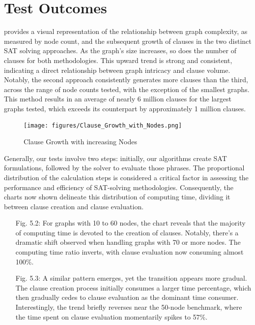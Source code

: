\documentclass[bachelor, english]{algothesis}
\begin{document}
\section{Test Outcomes}
 provides a visual representation of the relationship between graph complexity, as measured by node count, and the subsequent growth of clauses in the two distinct SAT solving approaches. As the graph's size increases, so does the number of clauses for both methodologies. This upward trend is strong and consistent, indicating a direct relationship between graph intricacy and clause volume. Notably, the second approach consistently generates more clauses than the third, across the range of node counts tested, with the exception of the smallest graphs. This method results in an average of nearly 6 million clauses for the largest graphs tested, which exceeds its counterpart by approximately 1 million clauses.
\begin{figure}[ht]
    \hspace{-1,75cm}
    \texttt{[image: figures/Clause\_Growth\_with\_Nodes.png]}
    \caption{Clause Growth with increasing Nodes}
    \label{fig:clause_growth}
\end{figure}

\noindent
Generally, our tests involve two steps: initially, our algorithms create SAT formulations, followed by the solver to evaluate those phrases. The proportional distribution of the calculation steps is considered a critical factor in assessing the performance and efficiency of SAT-solving methodologies. Consequently, the charts now shown delineate this distribution of computing time, dividing it between clause creation and clause evaluation.
\begin{enumerate}
    \item [Fig. 5.2:] For graphs with 10 to 60 nodes, the chart reveals that the majority of computing time is devoted to the creation of clauses. Notably, there's a dramatic shift observed when handling graphs with 70 or more nodes. The computing time ratio inverts, with clause evaluation now consuming almost 100\%.
    \item [Fig. 5.3:] A similar pattern emerges, yet the transition appears more gradual. The clause creation process initially consumes a larger time percentage, which then gradually cedes to clause evaluation as the dominant time consumer. Interestingly, the trend briefly reverses near the 50-node benchmark, where the time spent on clause evaluation momentarily spikes to 57\%.
\end{enumerate}
\end{document}
